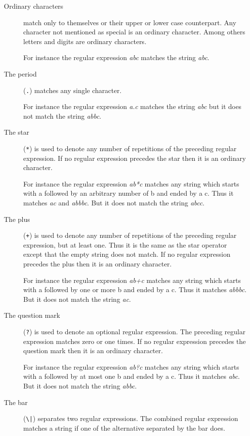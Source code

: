 \documentclass[11pt,a4paper]{scrbook}
\begin{document}
\begin{description}
\item[Ordinary characters] match only to themselves or their upper or lower
  case counterpart. Any character not mentioned as special is an ordinary
  character. Among others letters and digits are ordinary characters.

  For instance the regular expression \emph{abc} matches the string
  \emph{abc}.

\item[The period] (\verb|.|) matches any single character.
  
  For instance the regular expression \emph{a.c} matches the string \emph{abc}
  but it does not match the string \emph{abbc}.
  
\item[The star] (\verb|*|) is used to denote any number of repetitions of the
  preceding regular expression. If no regular expression precedes the star then
  it is an ordinary character.
  
  For instance the regular expression \emph{ab*c} matches any string which
  starts with a followed by an arbitrary number of b and ended by a c. Thus it
  matches \emph{ac} and \emph{abbbc}. But it does not match the string
  \emph{abcc}.
  
\item[The plus] (\verb|+|) is used to denote any number of repetitions of the
  preceding regular expression, but at least one. Thus it is the same as the
  star operator except that the empty string does not match. If no regular
  expression precedes the plus then it is an ordinary character.
  
  For instance the regular expression \emph{ab+c} matches any string which
  starts with a followed by one or more b and ended by a c. Thus it matches
  \emph{abbbc}.  But it does not match the string \emph{ac}.
  
\item[The question mark] (\verb|?|) is used to denote an optional regular
  expression. The preceding regular expression matches zero or one times. If
  no regular expression precedes the question mark then it is an ordinary
  character.
  
  For instance the regular expression \emph{ab?c} matches any string which
  starts with a followed by at most one b and ended by a c. Thus it matches
  \emph{abc}. But it does not match the string \emph{abbc}.

\item[The bar] (\verb/\|/) separates two regular expressions. The combined
  regular expression matches a string if one of the alternative separated by
  the bar does.


\end{description}
\end{document}
